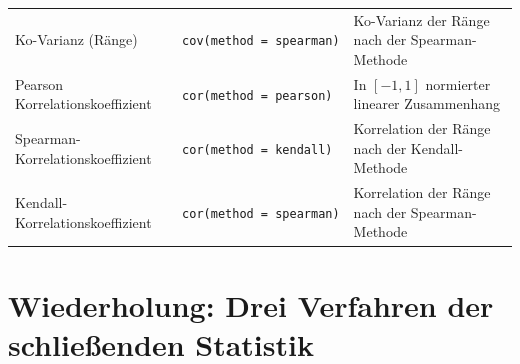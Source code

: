 \documentclass[]{book}
\begin{document}
\begin{longtable}[]{@{}lll@{}}
\begin{minipage}[t]{0.13\columnwidth}
Ko-Varianz (Ränge)\strut
\end{minipage} & \begin{minipage}[t]{0.33\columnwidth}\raggedright\strut
\texttt{cov(method\ =\ \textquotesingle{}spearman\textquotesingle{})}\strut
\end{minipage} & \begin{minipage}[t]{0.46\columnwidth}\raggedright\strut
Ko-Varianz der Ränge nach der Spearman-Methode\strut
\end{minipage}\tabularnewline
\begin{minipage}[t]{0.13\columnwidth}\raggedright\strut
Pearson Korrelationskoeffizient\strut
\end{minipage} & \begin{minipage}[t]{0.33\columnwidth}\raggedright\strut
\texttt{cor(method\ =\ \textquotesingle{}pearson\textquotesingle{})}\strut
\end{minipage} & \begin{minipage}[t]{0.46\columnwidth}\raggedright\strut
In \([-1, 1]\) normierter linearer Zusammenhang\strut
\end{minipage}\tabularnewline
\begin{minipage}[t]{0.13\columnwidth}\raggedright\strut
Spearman-Korrelationskoeffizient\strut
\end{minipage} & \begin{minipage}[t]{0.33\columnwidth}\raggedright\strut
\texttt{cor(method\ =\ \textquotesingle{}kendall\textquotesingle{})}\strut
\end{minipage} & \begin{minipage}[t]{0.46\columnwidth}\raggedright\strut
Korrelation der Ränge nach der Kendall-Methode\strut
\end{minipage}\tabularnewline
\begin{minipage}[t]{0.13\columnwidth}\raggedright\strut
Kendall-Korrelationskoeffizient\strut
\end{minipage} & \begin{minipage}[t]{0.33\columnwidth}\raggedright\strut
\texttt{cor(method\ =\ \textquotesingle{}spearman\textquotesingle{})}\strut
\end{minipage} & \begin{minipage}[t]{0.46\columnwidth}\raggedright\strut
Korrelation der Ränge nach der Spearman-Methode\strut
\end{minipage}\tabularnewline
\bottomrule
\end{longtable}

\hypertarget{stat-rep}{\chapter{Wiederholung: Drei Verfahren der
schließenden Statistik}\label{stat-rep}}
\end{document}
